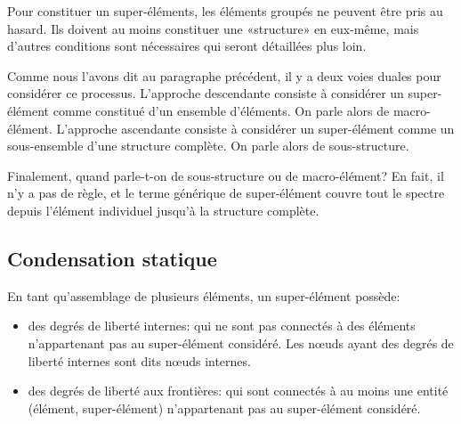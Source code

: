 Pour constituer un super-éléments, les éléments groupés ne peuvent être pris au hasard. Ils doivent au moins constituer une «structure» en eux-même, mais d'autres conditions sont nécessaires qui seront détaillées plus loin.

Comme nous l'avons dit au paragraphe précédent, il y a deux voies duales pour considérer ce processus.
L'approche descendante consiste à considérer un super-élément comme constitué d'un ensemble d'éléments. On parle alors de macro-élément. L'approche ascendante consiste à considérer un super-élément comme un sous-ensemble d'une structure complète. On parle alors de sous-structure.

Finalement, quand parle-t-on de sous-structure ou de macro-élément? En fait, il n'y a pas de règle, et le terme générique de super-élément couvre tout le spectre depuis l'élément individuel jusqu'à la structure complète.

\medskip
\subsection{Condensation statique}\label{Sec-condens}

En tant qu'assemblage de plusieurs éléments, un super-élément possède:
\begin{itemize}
  \item des degrés de liberté internes:
	qui ne sont pas connectés à des éléments n'appartenant pas au super-élément considéré.
	Les nœuds ayant des degrés de liberté internes sont dits nœuds internes.
  \item des degrés de liberté aux frontières:
	qui sont connectés à au moins une entité (élément, super-élément)
	n'appartenant pas au super-élément considéré.
\end{itemize}

